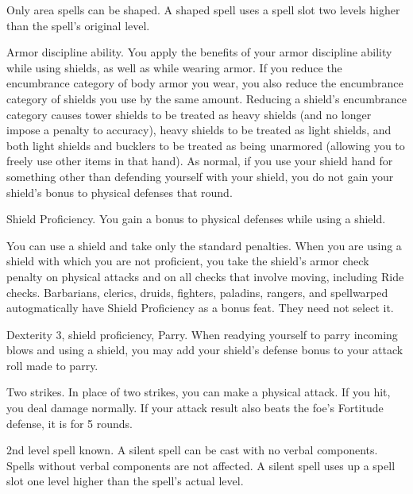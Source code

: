 Only area spells can be shaped.
A shaped spell uses a spell slot two levels higher than the spell's original level.

\featpre Armor discipline ability.
\featben You apply the benefits of your armor discipline ability while using shields, as well as while wearing armor.
If you reduce the encumbrance category of body armor you wear, you also reduce the encumbrance category of shields you use by the same amount.
Reducing a shield's encumbrance category causes tower shields to be treated as heavy shields (and no longer impose a  penalty to accuracy), heavy shields to be treated as light shields, and both light shields and bucklers to be treated as being unarmored (allowing you to freely use other items in that hand).
As normal, if you use your shield hand for something other than defending yourself with your shield, you do not gain your shield's bonus to physical defenses that round.

\featpre Shield Proficiency.
\featben You gain a  bonus to physical defenses while using a shield.

\featben You can use a shield and take only the standard penalties.
When you are using a shield with which you are not proficient, you take the shield's armor check penalty on physical attacks and on all checks that involve moving, including Ride checks.
Barbarians, clerics, druids, fighters, paladins, rangers, and spellwarped autogmatically have Shield Proficiency as a bonus feat.
They need not select it.

\featpres Dexterity 3, shield proficiency, Parry.
\featben When readying yourself to parry incoming blows and using a shield, you may add your shield's defense bonus to your attack roll made to parry.

\featpre Two strikes.
\featben In place of two strikes, you can make a physical attack.
If you hit, you deal damage normally.
If your attack result also beats the foe's Fortitude defense, it is \staggered for 5 rounds.

\featpre 2nd level spell known.
\featben A silent spell can be cast with no verbal components.
Spells without verbal components are not affected.
A silent spell uses up a spell slot one level higher than the spell's actual level.

